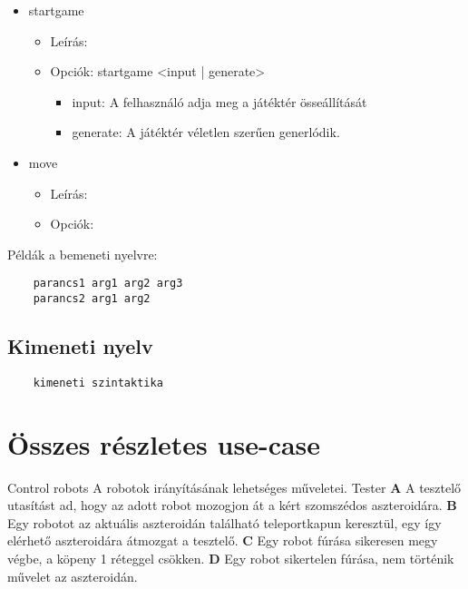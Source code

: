 \documentclass[../../projlab]{subfiles}
\begin{document}
\begin{itemize}
    \item startgame
    \begin{itemize}
        \item Leírás: 
        \item Opciók: startgame <input | generate>
        \begin{itemize}
            \item input: A felhasználó adja meg a játéktér össeállítását
            \item generate: A játéktér véletlen szerűen generlódik.
        \end{itemize}
    \end{itemize}
    \item move
    \begin{itemize}
        \item Leírás:
        \item Opciók:
    \end{itemize}
\end{itemize}
Példák a bemeneti nyelvre:
\begin{verbatim}
    parancs1 arg1 arg2 arg3
    parancs2 arg1 arg2
\end{verbatim}


\subsection{Kimeneti nyelv}
\begin{verbatim}
    kimeneti szintaktika
\end{verbatim}

\section{Összes részletes use-case}
\begin{use-case}
    {Control robots}
    {A robotok irányításának lehetséges műveletei. }
    {Tester} 
    \textbf{A} A tesztelő utasítást ad, hogy az adott robot mozogjon át a kért szomszédos aszteroidára.\newline
    \textbf{B} Egy robotot az aktuális aszteroidán található teleportkapun keresztül, egy így elérhető aszteroidára átmozgat a tesztelő. \newline
    \textbf{C} Egy robot fúrása sikeresen megy végbe, a köpeny 1 réteggel csökken. \newline
    \textbf{D} Egy robot sikertelen fúrása, nem történik művelet az aszteroidán. \newline

\end{use-case}
\end{document}
